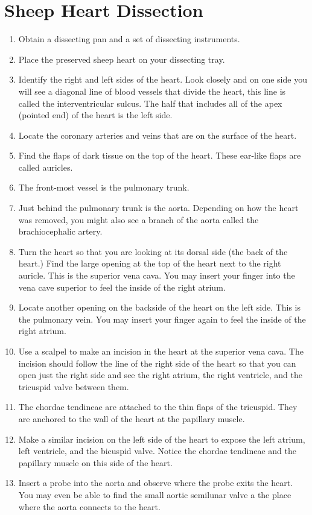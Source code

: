 \section{Sheep Heart Dissection}\label{sheep-heart-dissection}

\begin{enumerate}
\def\labelenumi{\arabic{enumi}.}
\tightlist
\item
  Obtain a dissecting pan and a set of dissecting instruments.
\item
  Place the preserved sheep heart on your dissecting tray.
\item
  Identify the right and left sides of the heart. Look closely and on
  one side you will see a diagonal line of blood vessels that divide the
  heart, this line is called the interventricular sulcus. The half that
  includes all of the apex (pointed end) of the heart is the left side.
\item
  Locate the coronary arteries and veins that are on the surface of the
  heart.
\item
  Find the flaps of dark tissue on the top of the heart. These ear-like
  flaps are called auricles.
\item
  The front-most vessel is the pulmonary trunk.
\item
  Just behind the pulmonary trunk is the aorta. Depending on how the
  heart was removed, you might also see a branch of the aorta called the
  brachiocephalic artery.
\item
  Turn the heart so that you are looking at its dorsal side (the back of
  the heart.) Find the large opening at the top of the heart next to the
  right auricle. This is the superior vena cava. You may insert your
  finger into the vena cave superior to feel the inside of the right
  atrium.
\item
  Locate another opening on the backside of the heart on the left side.
  This is the pulmonary vein. You may insert your finger again to feel
  the inside of the right atrium.
\item
  Use a scalpel to make an incision in the heart at the superior vena
  cava. The incision should follow the line of the right side of the
  heart so that you can open just the right side and see the right
  atrium, the right ventricle, and the tricuspid valve between them.
\item
  The chordae tendineae are attached to the thin flaps of the tricuspid.
  They are anchored to the wall of the heart at the papillary muscle.
\item
  Make a similar incision on the left side of the heart to expose the
  left atrium, left ventricle, and the bicuspid valve. Notice the
  chordae tendineae and the papillary muscle on this side of the heart.
\item
  Insert a probe into the aorta and observe where the probe exits the
  heart. You may even be able to find the small aortic semilunar valve a
  the place where the aorta connects to the heart.
\end{enumerate}

